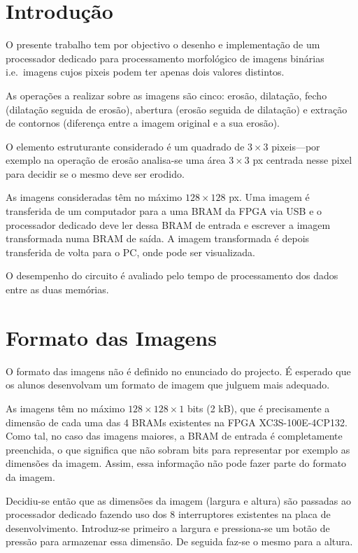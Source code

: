 \documentclass[a4paper]{article}
\begin{document}


\tableofcontents
\pagebreak

\section{Introdução}
O presente trabalho tem por objectivo o desenho e implementação de um processador dedicado para processamento morfológico de imagens binárias i.e.\ imagens cujos pixeis podem ter apenas dois valores distintos.

As operações a realizar sobre as imagens são cinco: erosão, dilatação, fecho (dilatação seguida de erosão), abertura (erosão seguida de dilatação) e extração de contornos (diferença entre a imagem original e a sua erosão).

O elemento estruturante considerado é um quadrado de $3\times3$ pixeis---por exemplo na operação de erosão analisa-se uma área $3\times3$ px centrada nesse pixel para decidir se o mesmo deve ser erodido.

As imagens consideradas têm no máximo $128\times128$ px. Uma imagem é transferida de um computador para a uma BRAM da FPGA via USB e o processador dedicado deve ler dessa BRAM de entrada e escrever a imagem transformada numa BRAM de saída. A imagem transformada é depois transferida de volta para o PC, onde pode ser visualizada.

O desempenho do circuito é avaliado pelo tempo de processamento dos dados entre as duas memórias.

\section{Formato das Imagens}
\label{sec:formato_imagens}
O formato das imagens não é definido no enunciado do projecto. É esperado que os alunos desenvolvam um formato de imagem que julguem mais adequado.

As imagens têm no máximo $128\times128\times1$ bits (2 kB), que é precisamente a dimensão de cada uma das 4 BRAMs existentes na FPGA XC3S-100E-4CP132. Como tal, no caso das imagens maiores, a BRAM de entrada é completamente preenchida, o que significa que não sobram bits para representar por exemplo as dimensões da imagem. Assim, essa informação não pode fazer parte do formato da imagem.

Decidiu-se então que as dimensões da imagem (largura e altura) são passadas ao processador dedicado fazendo uso dos 8 interruptores existentes na placa de desenvolvimento. Introduz-se primeiro a largura e pressiona-se um botão de pressão para armazenar essa dimensão. De seguida faz-se o mesmo para a altura.
\end{document}
